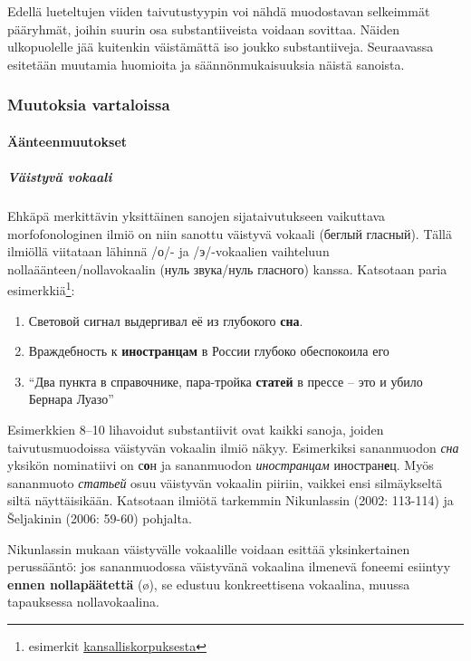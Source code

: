 \documentclass[]{scrartcl}
\providecommand{\tightlist}{%
  \setlength{\itemsep}{0pt}\setlength{\parskip}{0pt}}
\begin{document}
Edellä lueteltujen viiden taivutustyypin voi nähdä muodostavan
selkeimmät pääryhmät, joihin suurin osa substantiiveista voidaan
sovittaa. Näiden ulkopuolelle jää kuitenkin väistämättä iso joukko
substantiiveja. Seuraavassa esitetään muutamia huomioita ja
säännönmukaisuuksia näistä sanoista.

\subsubsection{Muutoksia vartaloissa}\label{muutoksia-vartaloissa}

\paragraph{Äänteenmuutokset}\label{uxe4uxe4nteenmuutokset}

\subparagraph{Väistyvä vokaali}\label{vuxe4istyvuxe4-vokaali}

Ehkäpä merkittävin yksittäinen sanojen sijataivutukseen vaikuttava
morfofonologinen ilmiö on niin sanottu väistyvä vokaali (беглый
гласный). Tällä ilmiöllä viitataan lähinnä /о/- ja /э/-vokaalien
vaihteluun nollaäänteen/nollavokaalin (нуль звука/нуль гласного) kanssa.
Katsotaan paria esimerkkiä\footnote{esimerkit
  \href{http://ruscorpora.ru}{kansalliskorpuksesta}}:

\begin{enumerate}
\def\labelenumi{(\arabic{enumi})}
\setcounter{enumi}{7}
\tightlist
\item
  Световой сигнал выдергивал её из глубокого \textbf{сна}.
\item
  Враждебность к \textbf{иностранцам} в России глубоко обеспокоила его
\item
  ``Два пункта в справочнике, пара-тройка \textbf{статей} в прессе --
  это и убило Бернара Луазо''
\end{enumerate}

Esimerkkien 8--10 lihavoidut substantiivit ovat kaikki sanoja, joiden
taivutusmuodoissa väistyvän vokaalin ilmiö näkyy. Esimerkiksi
sananmuodon \emph{сна} yksikön nominatiivi on с\textbf{о}н ja
sananmuodon \emph{иностранцам} иностран\textbf{е}ц. Myös sananmuoto
\emph{статьей} osuu väistyvän vokaalin piiriin, vaikkei ensi
silmäykseltä siltä näyttäisikään. Katsotaan ilmiötä tarkemmin
Nikunlassin (2002: 113-114) ja Šeljakinin (2006: 59-60) pohjalta.

Nikunlassin mukaan väistyvälle vokaalille voidaan esittää yksinkertainen
perussääntö: jos sananmuodossa väistyvänä vokaalina ilmenevä foneemi
esiintyy \textbf{ennen nollapäätettä} (ø), se edustuu konkreettisena
vokaalina, muussa tapauksessa nollavokaalina.
\end{document}
